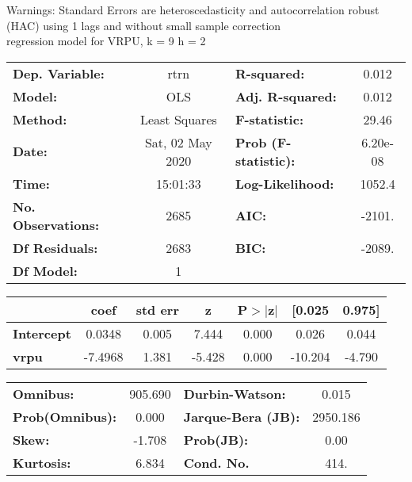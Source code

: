 Warnings: \newline
 [1] Standard Errors are heteroscedasticity and autocorrelation robust (HAC) using 1 lags and without small sample correction\\ 

regression model for VRPU, k = 9 h = 2\begin{center}
\begin{tabular}{lclc}
\toprule
\textbf{Dep. Variable:}    &       rtrn       & \textbf{  R-squared:         } &     0.012   \\
\textbf{Model:}            &       OLS        & \textbf{  Adj. R-squared:    } &     0.012   \\
\textbf{Method:}           &  Least Squares   & \textbf{  F-statistic:       } &     29.46   \\
\textbf{Date:}             & Sat, 02 May 2020 & \textbf{  Prob (F-statistic):} &  6.20e-08   \\
\textbf{Time:}             &     15:01:33     & \textbf{  Log-Likelihood:    } &    1052.4   \\
\textbf{No. Observations:} &        2685      & \textbf{  AIC:               } &    -2101.   \\
\textbf{Df Residuals:}     &        2683      & \textbf{  BIC:               } &    -2089.   \\
\textbf{Df Model:}         &           1      & \textbf{                     } &             \\
\bottomrule
\end{tabular}
\begin{tabular}{lcccccc}
                   & \textbf{coef} & \textbf{std err} & \textbf{z} & \textbf{P$> |$z$|$} & \textbf{[0.025} & \textbf{0.975]}  \\
\midrule
\textbf{Intercept} &       0.0348  &        0.005     &     7.444  &         0.000        &        0.026    &        0.044     \\
\textbf{vrpu}      &      -7.4968  &        1.381     &    -5.428  &         0.000        &      -10.204    &       -4.790     \\
\bottomrule
\end{tabular}
\begin{tabular}{lclc}
\textbf{Omnibus:}       & 905.690 & \textbf{  Durbin-Watson:     } &    0.015  \\
\textbf{Prob(Omnibus):} &   0.000 & \textbf{  Jarque-Bera (JB):  } & 2950.186  \\
\textbf{Skew:}          &  -1.708 & \textbf{  Prob(JB):          } &     0.00  \\
\textbf{Kurtosis:}      &   6.834 & \textbf{  Cond. No.          } &     414.  \\
\bottomrule
\end{tabular}
\end{center}

